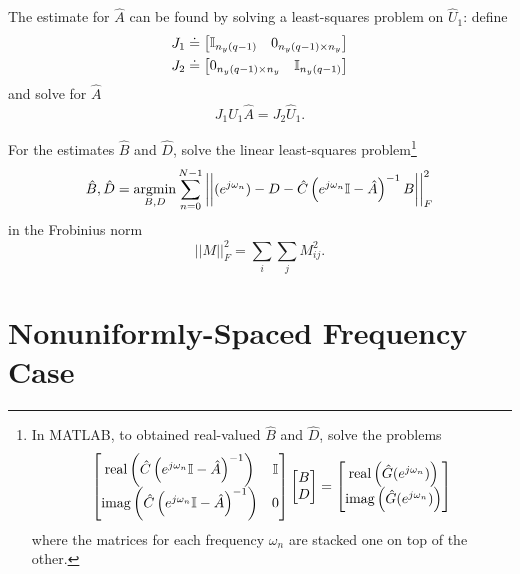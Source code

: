 The estimate for $\hat{A}$ can be found by solving a least-squares problem on $\hat{U}_1$: define
\begin{equation*}
  \begin{aligned}
    J_1 & \doteq
          \begin{bmatrix}
            \mathbb{I}_{n_y(q-1)} & 0_{n_y(q-1)\times n_y}
          \end{bmatrix} \\
    J_2 & \doteq
          \begin{bmatrix}
            0_{n_y(q-1)\times n_y} & \mathbb{I}_{n_y(q-1)}
          \end{bmatrix}
  \end{aligned}
\end{equation*}
and solve for $\hat{A}$
\begin{equation*}
  J_1\hat{U}_1\hat{A} = J_2\hat{U}_1.
\end{equation*}

For the estimates $\hat{B}$ and $\hat{D}$, solve the linear least-squares problem\footnote{In MATLAB, to obtained real-valued $\hat{B}$ and $\hat{D}$, solve the problems
  \begin{equation*}
    \begin{bmatrix}
      \textrm{real}\left(\hat{C}\left(e^{j\omega_n}\mathbb{I} - \hat{A}\right)^{-1}\right) & \mathbb{I} \\
      \textrm{imag}\left(\hat{C}\left(e^{j\omega_n}\mathbb{I} - \hat{A}\right)^{-1}\right) & 0
    \end{bmatrix}
    \begin{bmatrix}
      B \\ D
    \end{bmatrix} =
    \begin{bmatrix}
      \textrm{real}\left(\hat{G}(e^{j\omega_n})\right) \\
      \textrm{imag}\left(\hat{G}(e^{j\omega_n})\right)
    \end{bmatrix}
  \end{equation*}
  where the matrices for each frequency $\omega_n$ are stacked one on top of the other.}
\begin{equation*}
  \hat{B},\hat{D} = \operatorname*{argmin}_{B,D} \sum_{n=0}^{N-1}\left|\left| (e^{j\omega_n}) - D - \hat{C}\left(e^{j\omega_n}\mathbb{I} - \hat{A}\right)^{-1}B\right|\right|_F^2
\end{equation*}
in the Frobinius norm
\begin{equation*}
  ||M||_F^2 = \sum_i\sum_j M_{ij}^2.
\end{equation*}

\section{Nonuniformly-Spaced Frequency Case}

